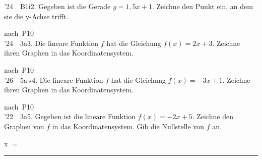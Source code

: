 \documentclass[11pt]{article}
\newlength{\gEin}\setlength{\gEin}{0pt}
\newcommand{\gzwei}[2]{\par\smallskip\noindent\sbox{\gbox}{#1}%
  \setlength{\gLinks}{\dimexpr0.5\textwidth-\gEin-\mbpfnr\relax}%
  \ifdim\wd\gbox>\dimexpr\gLinks-4mm\relax
    \usebox{\gbox}\par\smallskip\noindent\begin{minipage}{\linewidth}#2\end{minipage}%
  \else
    \begin{minipage}[t]{\gLinks}\vspace{0pt}\usebox{\gbox}\end{minipage}%
    \begin{minipage}[t]{\dimexpr\linewidth-\gLinks\relax}\vspace{0pt}\raggedright #2\end{minipage}%
  \fi\par}
\newcommand{\karo}[1]{\par\smallskip\noindent\begin{tikzpicture}
  \clip (0,0) rectangle ({\linewidth-1mm},{#1*10mm});
  \draw[black!16,line width=0.3pt,step=5mm] (0,0) grid ({\linewidth},{#1*10mm});
  \end{tikzpicture}\par}
\newcommand{\linie}[1]{\,{\color{black!45}\rule[-1pt]{#1}{0.4pt}}\,}
\newcommand{\pkt}{\textperiodcentered{}}
\begin{document}
\begin{pfaufg}{’24~\pkt{}~B1i}{2.}{}
Gegeben ist die Gerade $y = 1{,}5x + 1$. Zeichne den Punkt ein, an dem sie die y-Achse trifft.
\par\smallskip\noindent\begin{ksys}[xmin=-2,xmax=2,ymin=-2,ymax=2,karo=0.5]\end{ksys}\par
{}
\end{pfaufg}
\begin{pfaufg}{nach~P10\\’24~\pkt{}~3a}{3.}{}
Die lineare Funktion $f$ hat die Gleichung $f(x) = 2x + 3$. Zeichne ihren Graphen in das Koordinatensystem.
\gzwei{\begin{ksys}[xmin=-3,xmax=5,ymin=-2,ymax=12,karo=0.35]\end{ksys}}{\karo{4}}
\end{pfaufg}
\begin{pfaufg}{nach~P10\\’26~\pkt{}~5a\,$\star$}{4.}{}
Die lineare Funktion $f$ hat die Gleichung $f(x) = -3x + 1$. Zeichne ihren Graphen in das Koordinatensystem.
\gzwei{\begin{ksys}[xmin=-3,xmax=6,ymin=-3,ymax=6,karo=0.35]\parabel{1}{3}{-1}{p}\end{ksys}}{\karo{4}}
\end{pfaufg}
\begin{pfaufg}{nach~P10\\’22~\pkt{}~3a}{5.}{}
Gegeben ist die lineare Funktion $f(x) = -2x + 5$. Zeichne den Graphen von $f$ in das Koordinatensystem. Gib die Nullstelle von $f$ an.
\gzwei{\begin{ksys}[xmin=-4,xmax=5,ymin=-4,ymax=7,karo=0.35]\end{ksys}}{\karo{4}}
\par\noindent\hfill x $=$\linie{30mm}
\end{pfaufg}
\end{document}
